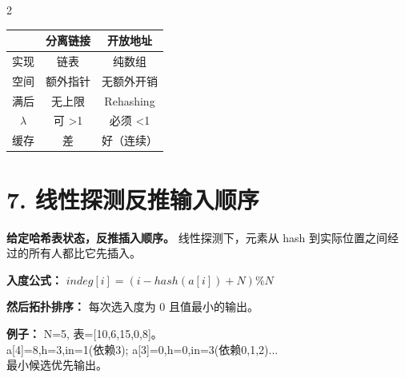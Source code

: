 \documentclass[10pt,a4paper]{article}
\begin{document}
\begin{multicols}{2}
\begin{tabular}{|c|c|c|}
\hline
& \textbf{分离链接} & \textbf{开放地址} \\
\hline
实现 & 链表 & 纯数组 \\
空间 & 额外指针 & 无额外开销 \\
满后 & 无上限 & Rehashing \\
$\lambda$ & 可 >1 & 必须 <1 \\
缓存 & 差 & 好（连续） \\
\hline
\end{tabular}

\section*{7. 线性探测反推输入顺序}

\begin{keybox}
\textbf{给定哈希表状态，反推插入顺序。} 线性探测下，元素从 hash 到实际位置之间经过的所有人都比它先插入。

\textbf{入度公式：} $indeg[i] = (i - hash(a[i]) + N) \% N$

\textbf{然后拓扑排序：} 每次选入度为 0 且值最小的输出。
\end{keybox}

\textbf{例子：} N=5, 表=[10,6,15,0,8]。\\
a[4]=8,h=3,in=1(依赖3); a[3]=0,h=0,in=3(依赖0,1,2)...\\
最小候选优先输出。

\end{multicols}
\end{document}
